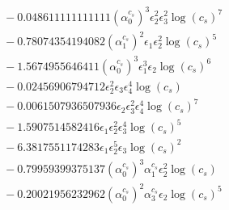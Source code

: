 \documentclass[10pt]{article}
\begin{document}
\begin{align*}
&{}  - 0.048611111111111 \left(\alpha_{0}^{c_s}\right)^{3} \epsilon_{2}^{2} \epsilon_{3}^{2} \log{\left(c_{s} \right)}^{7} \\
&{}  - 0.78074354194082 \left(\alpha_{1}^{c_s}\right)^{2} \epsilon_{1} \epsilon_{2}^{2} \log{\left(c_{s} \right)}^{5} \\
&{}  - 1.5674955646411 \left(\alpha_{0}^{c_s}\right)^{3} \epsilon_{1}^{3} \epsilon_{2} \log{\left(c_{s} \right)}^{6} \\
&{}  - 0.02456906794712 \epsilon_{2}^{2} \epsilon_{3} \epsilon_{4}^{4} \log{\left(c_{s} \right)} \\
&{}  - 0.0061507936507936 \epsilon_{2} \epsilon_{3}^{2} \epsilon_{4}^{4} \log{\left(c_{s} \right)}^{7} \\
&{}  - 1.5907514582416 \epsilon_{1} \epsilon_{2}^{2} \epsilon_{3}^{4} \log{\left(c_{s} \right)}^{5} \\
&{}  - 6.3817551174283 \epsilon_{1} \epsilon_{2}^{5} \epsilon_{3} \log{\left(c_{s} \right)}^{2} \\
&{}  - 0.79959399375137 \left(\alpha_{0}^{c_s}\right)^{3} \alpha_{1}^{c_s} \epsilon_{2}^{2} \log{\left(c_{s} \right)} \\
&{}  - 0.20021956232962 \left(\alpha_{0}^{c_s}\right)^{2} \alpha_{3}^{c_s} \epsilon_{2} \log{\left(c_{s} \right)}^{5}
\end{align*}
\end{document}
